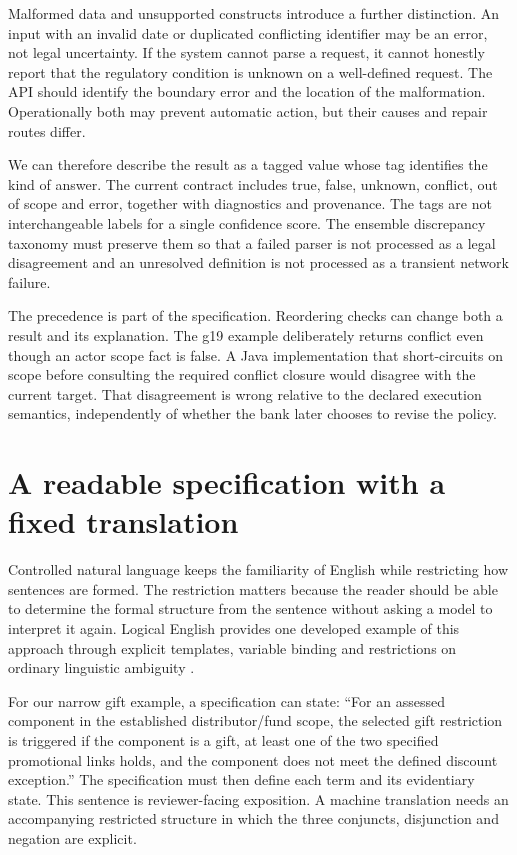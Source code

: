 \documentclass[12pt,a4paper,oneside,openany]{book}
\begin{document}
Malformed data and unsupported constructs introduce a further distinction.
An input with an invalid date or duplicated conflicting identifier may be an
error, not legal uncertainty. If the system cannot parse a request, it cannot
honestly report that the regulatory condition is unknown on a well-defined
request. The API should identify the boundary error and the location of the
malformation. Operationally both may prevent automatic action, but their causes
and repair routes differ.

We can therefore describe the result as a tagged value whose tag identifies
the kind of answer. The current contract includes true, false, unknown,
conflict, out of scope and error, together with diagnostics and provenance.
The tags are not interchangeable labels for a single confidence score. The
ensemble discrepancy taxonomy must preserve them so that a failed parser is
not processed as a legal disagreement and an unresolved definition is not
processed as a transient network failure.

The precedence is part of the specification. Reordering checks can change
both a result and its explanation. The g19 example deliberately returns
conflict even though an actor scope fact is false. A Java implementation that
short-circuits on scope before consulting the required conflict closure would
disagree with the current target. That disagreement is wrong relative to the
declared execution semantics, independently of whether the bank later chooses
to revise the policy.

\section{A readable specification with a fixed translation}
\label{merge:M03:07}

\label{sec:proof-cnl}
Controlled natural language keeps the familiarity of English while restricting
how sentences are formed. The restriction matters because the reader should
be able to determine the formal structure from the sentence without asking a
model to interpret it again. Logical English provides one developed example of
this approach through explicit templates, variable binding and restrictions on
ordinary linguistic ambiguity \citep[language and law examples]{logicalenglish2023}.

For our narrow gift example, a specification can state: ``For an assessed
component in the established distributor/fund scope, the selected gift
restriction is triggered if the component is a gift, at least one of the two
specified promotional links holds, and the component does not meet the defined
discount exception.'' The specification must then define each term and its
evidentiary state. This sentence is reviewer-facing exposition. A machine
translation needs an accompanying restricted structure in which the three
conjuncts, disjunction and negation are explicit.
\end{document}
